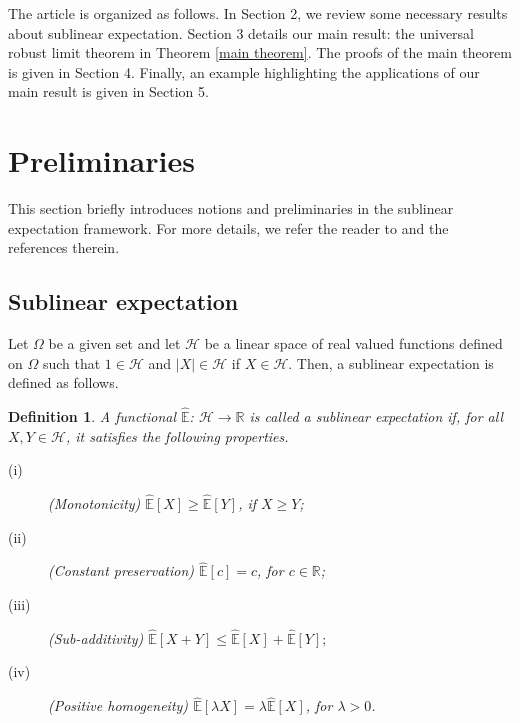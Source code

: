 \documentclass[a4paper,oneside,10pt]{article}%
\newtheorem{definition}[theorem]{Definition}
\numberwithin{equation}{section}
\begin{document}


The article is organized as follows. In Section 2, we review some necessary
results about sublinear expectation. Section 3 details our main result: the
universal robust limit theorem in Theorem \ref{main theorem}. The proofs of
the main theorem is given in Section 4. Finally, an example highlighting the
applications of our main result is given in Section 5.



\section{Preliminaries}

This section briefly introduces notions and preliminaries in the sublinear
expectation framework. For more details, we refer the reader to
\cite{P2007,P20081,P2010_CLT,P2010} and the references therein.

\subsection{Sublinear expectation}

Let $\Omega$ be a given set and let $\mathcal{H}$ be a linear space of real
valued functions defined on $\Omega$ such that $1\in \mathcal{H}$ and $\vert X
\vert \in \mathcal{H}$ if $X\in \mathcal{H}$. Then, a sublinear expectation is
defined as follows.

\begin{definition}
A functional $\mathbb{\hat{E}}$: $\mathcal{H}\rightarrow \mathbb{R}$ is called
a sublinear expectation if, for all $X,Y\in \mathcal{H}$, it satisfies the
following properties.

\begin{description}
\item[(i)] (Monotonicity) $\mathbb{\hat{E}}[X] \geq \mathbb{\hat{E}}[Y]$, if
$X\geq Y$;

\item[(ii)] (Constant preservation) $\mathbb{\hat{E}}[c] =c$, for
$c\in \mathbb{R}$;

\item[(iii)] (Sub-additivity) $\mathbb{\hat{E}}[X+Y] \leq \mathbb{\hat{E}} [X]
+\mathbb{\hat{E}}[Y] ;$

\item[(iv)] (Positive homogeneity) $\mathbb{\hat{E}}[\lambda X] =\lambda
\mathbb{\hat{E}}[X]$, for $\lambda>0$.
\end{description}
\end{definition}
\end{document}
